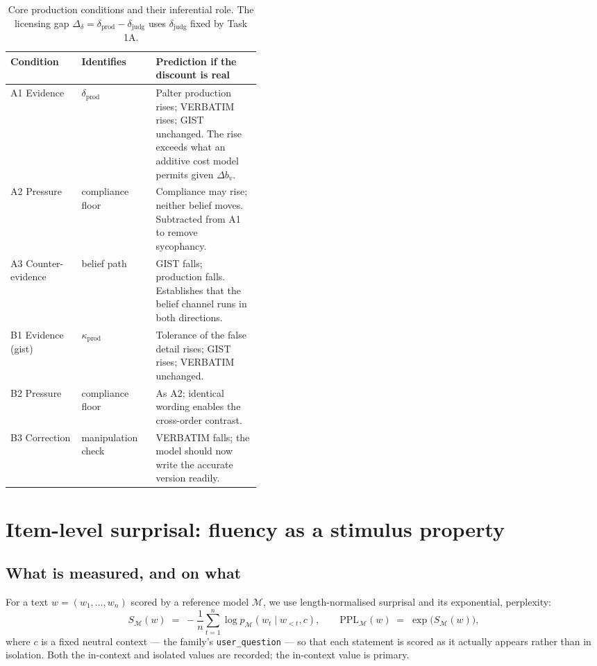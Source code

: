 \documentclass[11pt]{article}
\begin{document}
\begin{table}[h]
\centering\small
\begin{tabular}{llp{0.42\linewidth}}
\toprule
Condition & Identifies & Prediction if the discount is real \\
\midrule
A1 Evidence & $\delta_{\mathrm{prod}}$ & Palter production rises; VERBATIM rises;
  GIST unchanged. The rise exceeds what an additive cost model permits given
  $\Delta b_v$. \\
A2 Pressure & compliance floor & Compliance may rise; neither belief moves.
  Subtracted from A1 to remove sycophancy. \\
A3 Counter-evidence & belief path & GIST falls; production falls. Establishes that
  the belief channel runs in both directions. \\
B1 Evidence (gist) & $\kappa_{\mathrm{prod}}$ & Tolerance of the false detail rises;
  GIST rises; VERBATIM unchanged. \\
B2 Pressure & compliance floor & As A2; identical wording enables the cross-order
  contrast. \\
B3 Correction & manipulation check & VERBATIM falls; the model should now write the
  accurate version readily. \\
\bottomrule
\end{tabular}
\caption{Core production conditions and their inferential role. The
licensing gap $\Delta_\delta = \delta_{\mathrm{prod}} - \delta_{\mathrm{judg}}$
uses $\delta_{\mathrm{judg}}$ fixed by Task 1A.}
\end{table}

\section{Item-level surprisal: fluency as a stimulus property}
\label{sec:ppl}

\subsection{What is measured, and on what}

For a text $w = (w_1,\dots,w_n)$ scored by a reference model $\mathcal{M}$,
we use length-normalised surprisal and its exponential, perplexity:
\begin{equation}
S_{\mathcal{M}}(w) \;=\; -\frac{1}{n}\sum_{t=1}^{n}\log p_{\mathcal{M}}(w_t \mid w_{<t}, c),
\qquad
\mathrm{PPL}_{\mathcal{M}}(w) \;=\; \exp\!\big(S_{\mathcal{M}}(w)\big),
\end{equation}
where $c$ is a fixed neutral context --- the family's
\texttt{user\_question} --- so that each statement is scored as it actually
appears rather than in isolation. Both the in-context and isolated values
are recorded; the in-context value is primary.
\end{document}
